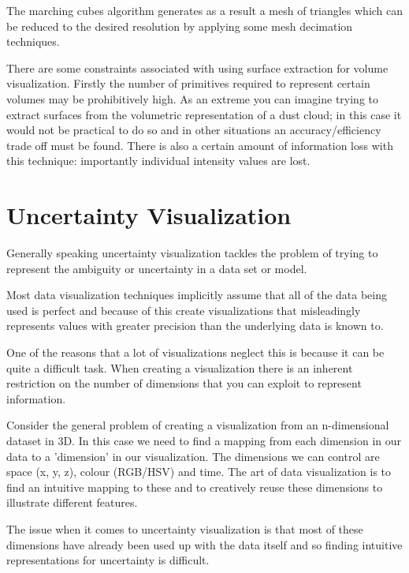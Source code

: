 The marching cubes algorithm generates as a result a mesh of triangles which can be reduced to the desired resolution by applying some mesh decimation techniques.

There are some constraints associated with using surface extraction for volume visualization. Firstly the number of primitives required to represent certain volumes may be prohibitively high. As an extreme you can imagine trying to extract surfaces from the volumetric representation of a dust cloud; in this case it would not be practical to do so and in other situations an accuracy/efficiency trade off must be found. There is also a certain amount of information loss with this technique: importantly individual intensity values are lost.

\newpage
\section{Uncertainty Visualization}\label{background:uncertaintyvisualization}

Generally speaking uncertainty visualization tackles the problem of trying to represent the ambiguity or uncertainty in a data set or model.

Most data visualization techniques implicitly assume that all of the data being used is perfect and because of this create visualizations that misleadingly represents values with greater precision than the underlying data is known to.

One of the reasons that a lot of visualizations neglect this is because it can be quite a difficult task. When creating a visualization there is an inherent restriction on the number of dimensions that you can exploit to represent information.

Consider the general problem of creating a visualization from an n-dimensional dataset in 3D. In this case we need to find a mapping from each dimension in our data to a 'dimension' in our visualization. The dimensions we can control are space (x, y, z), colour (RGB/HSV) and time. The art of data visualization is to find an intuitive mapping to these and to creatively reuse these dimensions to illustrate different features.

The issue when it comes to uncertainty visualization is that most of these dimensions have already been used up with the data itself and so finding intuitive representations for uncertainty is difficult.

